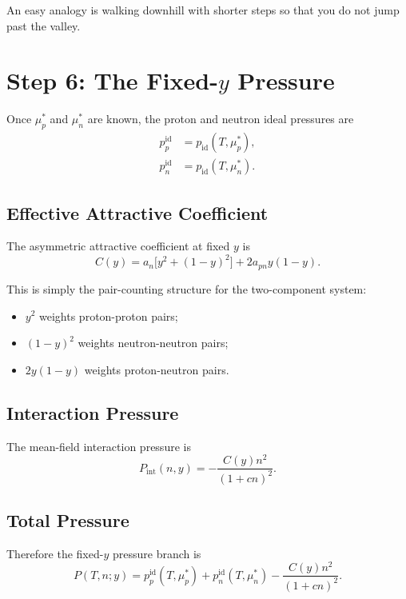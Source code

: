 \documentclass[11pt]{article}
\begin{document}
An easy analogy is walking downhill with shorter steps so that you do not jump
past the valley.

\section{Step 6: The Fixed-\texorpdfstring{$y$}{y} Pressure}

Once $\mu_p^\ast$ and $\mu_n^\ast$ are known, the proton and neutron ideal
pressures are
\begin{align}
p_p^{\mathrm{id}} &= p_{\mathrm{id}}(T,\mu_p^\ast), \\
p_n^{\mathrm{id}} &= p_{\mathrm{id}}(T,\mu_n^\ast).
\end{align}

\subsection{Effective Attractive Coefficient}

The asymmetric attractive coefficient at fixed $y$ is
\begin{equation}
C(y)
=
a_n\big[y^2+(1-y)^2\big]+2a_{pn}y(1-y).
\end{equation}

This is simply the pair-counting structure for the two-component system:
\begin{itemize}
\item $y^2$ weights proton-proton pairs;
\item $(1-y)^2$ weights neutron-neutron pairs;
\item $2y(1-y)$ weights proton-neutron pairs.
\end{itemize}

\subsection{Interaction Pressure}

The mean-field interaction pressure is
\begin{equation}
P_{\mathrm{int}}(n,y)
=
-\frac{C(y)n^2}{(1+cn)^2}.
\end{equation}

\subsection{Total Pressure}

Therefore the fixed-$y$ pressure branch is
\begin{equation}
P(T,n;y)
=
p_p^{\mathrm{id}}(T,\mu_p^\ast)
+
p_n^{\mathrm{id}}(T,\mu_n^\ast)
-\frac{C(y)n^2}{(1+cn)^2}.
\end{equation}
\end{document}
